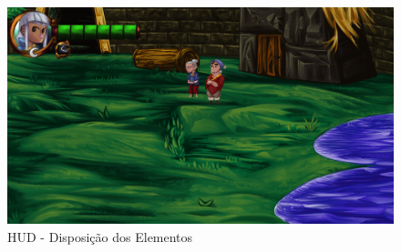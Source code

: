 \documentclass[12pt]{article}
\begin{document}
\begin{figure}[!htb]
    \centering
    \includegraphics[scale=0.39]{camera_hud_03.png}
    \caption{HUD - Disposição dos Elementos}
    \label{fig:camera_hud_03}
\end{figure}
\end{document}
